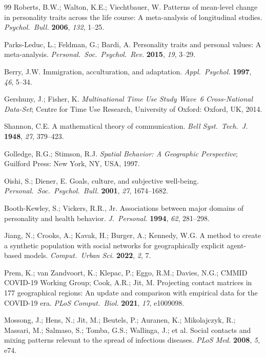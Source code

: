 \documentclass[a4paper,12pt]{article}
\begin{document}
\begin{thebibliography}{99}
Roberts, B.W.; Walton, K.E.; Viechtbauer, W. Patterns of mean-level change
in personality traits across the life course: A meta-analysis of longitudinal
studies. \textit{Psychol.\ Bull.} \textbf{2006}, \textit{132}, 1--25.

Parks-Leduc, L.; Feldman, G.; Bardi, A. Personality traits and personal values:
A meta-analysis. \textit{Personal.\ Soc.\ Psychol.\ Rev.} \textbf{2015},
\textit{19}, 3--29.

Berry, J.W. Immigration, acculturation, and adaptation.
\textit{Appl.\ Psychol.} \textbf{1997}, \textit{46}, 5--34.

Gershuny, J.; Fisher, K.
\textit{Multinational Time Use Study Wave~6 Cross-National Data-Set};
Centre for Time Use Research, University of Oxford: Oxford, UK, 2014.

Shannon, C.E. A mathematical theory of communication.
\textit{Bell Syst.\ Tech.\ J.} \textbf{1948}, \textit{27}, 379--423.

Golledge, R.G.; Stimson, R.J.
\textit{Spatial Behavior: A Geographic Perspective};
Guilford Press: New York, NY, USA, 1997.

Oishi, S.; Diener, E. Goals, culture, and subjective well-being.
\textit{Personal.\ Soc.\ Psychol.\ Bull.} \textbf{2001}, \textit{27},
1674--1682.

Booth-Kewley, S.; Vickers, R.R., Jr.
Associations between major domains of personality and health behavior.
\textit{J.\ Personal.} \textbf{1994}, \textit{62}, 281--298.

Jiang, N.; Crooks, A.; Kavak, H.; Burger, A.; Kennedy, W.G.
A method to create a synthetic population with social networks for
geographically explicit agent-based models.
\textit{Comput.\ Urban Sci.} \textbf{2022}, \textit{2}, 7.

Prem, K.; van Zandvoort, K.; Klepac, P.; Eggo, R.M.; Davies, N.G.;
CMMID COVID-19 Working Group; Cook, A.R.; Jit, M.
Projecting contact matrices in 177 geographical regions: An update and
comparison with empirical data for the COVID-19 era.
\textit{PLoS Comput.\ Biol.} \textbf{2021}, \textit{17}, e1009098.

Mossong, J.; Hens, N.; Jit, M.; Beutels, P.; Auranen, K.; Mikolajczyk, R.;
Massari, M.; Salmaso, S.; Tomba, G.S.; Wallinga, J.; et al.
Social contacts and mixing patterns relevant to the spread of infectious diseases.
\textit{PLoS Med.} \textbf{2008}, \textit{5}, e74.


\end{thebibliography}
\end{document}
